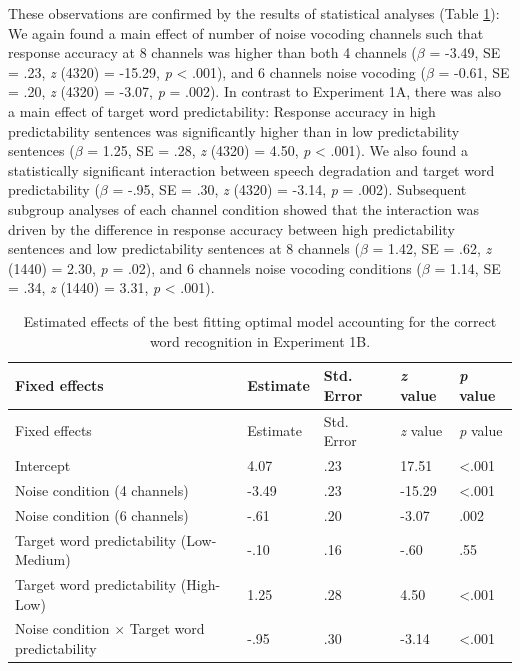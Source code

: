 \documentclass[a4paper, nobind]{templates/ociamthesis}
\begin{document}
These observations are confirmed by the results of statistical analyses (Table \ref{results1b}):
We again found a main effect of number of noise vocoding channels such that response accuracy at 8 channels was higher than both 4 channels (\(\beta\) = -3.49, SE = .23, \emph{z} (4320) = -15.29, \emph{p} \textless{} .001), and 6 channels noise vocoding (\(\beta\) = -0.61, SE = .20, \emph{z} (4320) = -3.07, \emph{p} = .002).
In contrast to Experiment 1A, there was also a main effect of target word predictability:
Response accuracy in high predictability sentences was significantly higher than in low predictability sentences (\(\beta\) = 1.25, SE = .28, \emph{z} (4320) = 4.50, \emph{p} \textless{} .001).
We also found a statistically significant interaction between speech degradation and target word predictability (\(\beta\) = -.95, SE = .30, \emph{z} (4320) = -3.14, \emph{p} = .002).
Subsequent subgroup analyses of each channel condition showed that the interaction was driven by the difference in response accuracy between high predictability sentences and low predictability sentences at 8 channels (\(\beta\) = 1.42, SE = .62, \emph{z} (1440) = 2.30, \emph{p} = .02), and 6 channels noise vocoding conditions (\(\beta\) = 1.14, SE = .34, \emph{z} (1440) = 3.31, \emph{p} \textless{} .001).

\begin{longtable}[]{@{}lllll@{}}
\caption{Estimated effects of the best fitting optimal model accounting
for the correct word recognition in Experiment 1B.}
\label{results1b}
\tabularnewline
\toprule
Fixed effects & Estimate & Std. Error & \emph{z} value & \emph{p}
value \\
\midrule
\endfirsthead
\toprule
Fixed effects & Estimate & Std. Error & \emph{z} value & \emph{p}
value \\
\midrule
\endhead
Intercept & 4.07 & .23 & 17.51 & \textless.001 \\
Noise condition (4 channels) & -3.49 & .23 & -15.29 & \textless.001 \\
Noise condition (6 channels) & -.61 & .20 & -3.07 & .002 \\
Target word predictability (Low-Medium) & -.10 & .16 & -.60 & .55 \\
Target word predictability (High-Low) & 1.25 & .28 & 4.50 &
\textless.001 \\
Noise condition $\times$ Target word predictability & -.95 & .30 & -3.14 &
\textless.001 \\
\bottomrule
\end{longtable}
\end{document}
